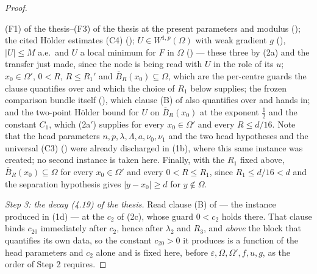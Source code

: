 \begin{proof}
\begin{enumerate}
  (F1) of the thesis--(F3) of the thesis at the present parameters and modulus
  (); the cited H\"older estimates (C4)
  (); $U\in W^{1,p}(\Omega)$ with weak gradient
  $g$ (), $|U|\le M$ a.e.\ and $U$ a local minimum for $F$ in
  $\Omega$ () --- these three by (2a) and the transfer
  just made, since the node is being read with $U$ in the role of its $u$;
  $x_0\in\Omega'$, $0<R$, $R\le R_1'$ and
  $\overline B_R(x_0)\subseteq\Omega$, which are the per-centre guards the
  clause quantifies over and which the choice of $R_1$ below supplies; the
  frozen comparison bundle itself (), which clause
  (B) of  also quantifies over and hands
  in; and the two-point H\"older bound for $U$ on
  $\overline B_R(x_0)$ at the exponent $\tfrac12$ and the constant $C_1$, which
  (2a$'$) supplies for every $x_0\in\Omega'$ and every $R\le d/16$.  Note that
  the head parameters $n,p,\lambda,\Lambda,a,\nu_0,\nu_1$ and the two head
  hypotheses  and the universal (C3)
  () were already discharged in (1b), where this
  same instance was created; no second instance is taken here.  Finally, with
  the $R_1$ fixed above, $\overline B_R(x_0)\subseteq\Omega$ for every
  $x_0\in\Omega'$ and every $0<R\le R_1$, since $R_1\le d/16<d$ and the
  separation hypothesis gives $|y-x_0|\ge d$ for $y\notin\Omega$.
\end{enumerate}

\emph{Step 3: the decay (4.19) of the thesis.}  Read clause (B) of
 --- the instance produced in (1d) ---
at the $c_2$ of (2c), whose guard $0<c_2$ holds there.  That clause binds
$c_{20}$ immediately after $c_2$, hence after $\lambda_2$ and $R_3$, and
\emph{above} the block that quantifies its own data, so the constant $c_{20}>0$
it produces is a function of the head parameters and $c_2$ alone and is fixed
here, before $\varepsilon,\Omega,\Omega',f,u,g$, as the order of Step 2
requires.


\end{proof}
